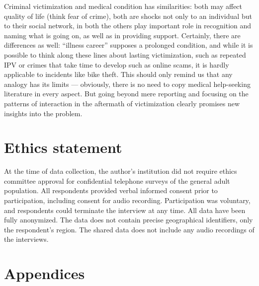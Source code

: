 \documentclass[]{interact}
\theoremstyle{plain}%
\theoremstyle{definition}
\theoremstyle{remark}
\begin{document}
	Criminal victimization and medical condition has similarities: both may affect quality of life (think fear of crime), both are shocks not only to an individual but to their social network, in both the others play important role in recognition and naming what is going on, as well as in providing support. Certainly, there are differences as well: ``illness career'' supposes a prolonged condition, and while it is possible to think along these lines about lasting victimization, such as repeated IPV or crimes that take time to develop such as online scams, it is hardly applicable to incidents like bike theft. This should only remind us that any analogy has its limits --- obviously, there is no need to copy medical help-seeking literature in every aspect. But going beyond mere reporting and focusing on the patterns of interaction in the aftermath of victimization clearly promises new insights into the problem.
	
	\section*{Ethics statement}  
	At the time of data collection, the author's institution did not require ethics committee approval for confidential telephone surveys of the general adult population. All respondents provided verbal informed consent prior to participation, including consent for audio recording. Participation was voluntary, and respondents could terminate the interview at any time. All data have been fully anonymized. The data does not contain precise geographical identifiers, only the respondent’s region. The shared data does not include any audio recordings of the interviews.
		
	\printbibliography
%		
%				
%				
		
		
	\section*{Appendices}
		
\end{document}
